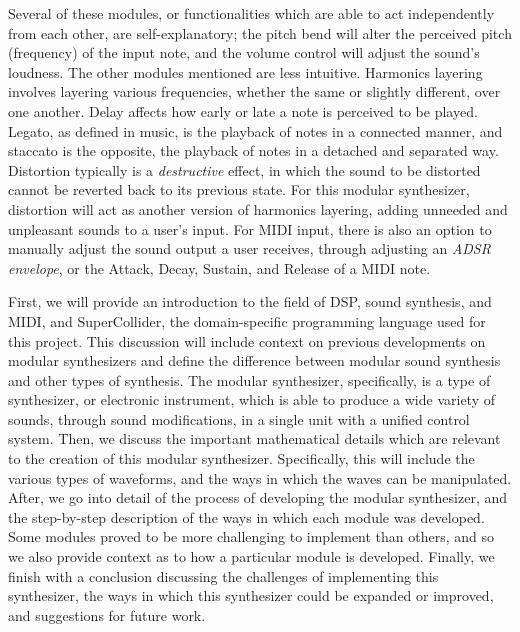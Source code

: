 Several of these modules, or functionalities which are able to act independently from each other, are self-explanatory; the pitch bend will alter the perceived pitch (frequency) of the input note, and the volume control will adjust the sound's loudness. The other modules mentioned are less intuitive. Harmonics layering involves layering various frequencies, whether the same or slightly different, over one another. Delay affects how early or late a note is perceived to be played. Legato, as defined in music, is the playback of notes in a connected manner, and staccato is the opposite, the playback of notes in a detached and separated way. Distortion typically is a \textit{destructive} effect, in which the sound to be distorted cannot be reverted back to its previous state. For this modular synthesizer, distortion will act as another version of harmonics layering, adding unneeded and unpleasant sounds to a user's input. For MIDI input, there is also an option to manually adjust the sound output a user receives, through adjusting an \textit{ADSR envelope}, or the Attack, Decay, Sustain, and Release of a MIDI note.

First, we will provide an introduction to the field of DSP, sound synthesis, and MIDI, and SuperCollider, the domain-specific programming language used for this project. This discussion will include context on previous developments on modular synthesizers and define the difference between modular sound synthesis and other types of synthesis. The modular synthesizer, specifically, is a type of synthesizer, or electronic instrument, which is able to produce a wide variety of sounds, through sound modifications, in a single unit with a unified control system. Then, we discuss the important mathematical details which are relevant to the creation of this modular synthesizer. Specifically, this will include the various types of waveforms, and the ways in which the waves can be manipulated. After, we go into detail of the process of developing the modular synthesizer, and the step-by-step description of the ways in which each module was developed. Some modules proved to be more challenging to implement than others, and so we also provide context as to how a particular module is developed. Finally, we finish with a conclusion discussing the challenges of implementing this synthesizer, the ways in which this synthesizer could be expanded or improved, and suggestions for future work.